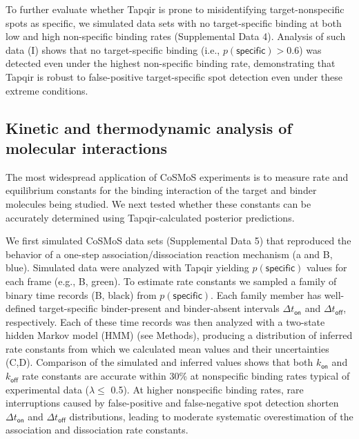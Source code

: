 To further evaluate whether Tapqir is prone to misidentifying target-nonspecific spots as specific, we  simulated data sets with no target-specific binding at both low and high non-specific binding rates (Supplemental Data 4). Analysis of such data (I) shows that no target-specific binding (i.e., $p(\mathsf{specific}) > 0.6$) was detected even under the highest non-specific binding rate, demonstrating that Tapqir is robust to false-positive target-specific spot detection even under these extreme conditions. 

\subsection{Kinetic and thermodynamic analysis of molecular interactions}

The most widespread application of CoSMoS experiments is to measure rate and equilibrium constants for the binding interaction of the target and binder molecules being studied.  We next tested whether these constants can be accurately determined using Tapqir-calculated posterior predictions. 

We first simulated CoSMoS data sets (Supplemental Data 5) that reproduced the behavior of a one-step association/dissociation reaction mechanism (a and B, blue). Simulated data were analyzed with Tapqir yielding $p(\mathsf{specific})$ values for each frame (e.g., B, green). To estimate rate constants we sampled a family of binary time records (B, black) from $p(\mathsf{specific})$. Each family member has well-defined target-specific binder-present and binder-absent intervals $\Delta t_\mathsf{on}$ and $\Delta t_\mathsf{off}$, respectively. Each of these time records was then analyzed with a two-state hidden Markov model (HMM) (see Methods), producing a distribution of inferred rate constants from which we calculated mean values and their uncertainties (C,D). Comparison of the simulated and inferred values shows that both $k_\mathsf{on}$ and $k_\mathsf{off}$ rate constants are accurate within 30\% at nonspecific binding rates typical of experimental data ($\lambda \leq$ 0.5). At higher nonspecific binding rates, rare interruptions caused by false-positive and false-negative spot detection shorten $\Delta t_\mathsf{on}$ and $\Delta t_\mathsf{off}$ distributions, leading to moderate systematic overestimation of the association and dissociation rate constants.


